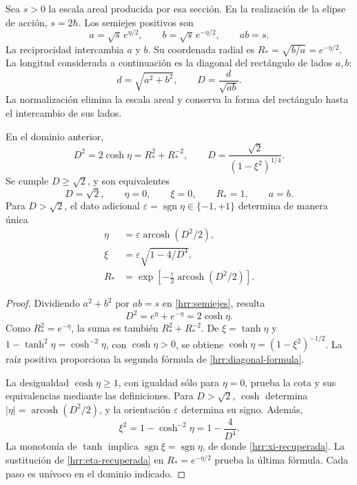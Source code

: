 Sea \(s>0\) la escala areal producida por esa sección. En la realización
de la elipse de acción, \(s=2\hbar\). Los semiejes positivos son
\begin{equation}
 a=\sqrt{s}\,e^{\eta/2},\qquad
 b=\sqrt{s}\,e^{-\eta/2},\qquad ab=s.
 \label{hrr:semiejes}
\end{equation}
La reciprocidad intercambia \(a\) y \(b\). Su coordenada radial es
\(R_*=\sqrt{b/a}=e^{-\eta/2}\). La longitud considerada a
continuación es la diagonal del rectángulo de lados \(a,b\):
\[
 d=\sqrt{a^2+b^2},\qquad D=\frac{d}{\sqrt{ab}}.
\]
La normalización elimina la escala areal y conserva la forma del
rectángulo hasta el intercambio de sus lados.

\begin{theorem}
\label{hrr:diagonal-teorema}
En el dominio anterior,
\begin{equation}
 D^2=2\cosh\eta=R_*^2+R_*^{-2},
 \qquad
 D=\frac{\sqrt2}{(1-\xi^2)^{1/4}}.
 \label{hrr:diagonal-formula}
\end{equation}
Se cumple \(D\geq\sqrt2\), y son equivalentes
\[
 D=\sqrt2,\qquad \eta=0,\qquad \xi=0,\qquad R_*=1,
 \qquad a=b.
\]
Para \(D>\sqrt2\), el dato adicional
\(\varepsilon=\operatorname{sgn}\eta\in\{-1,+1\}\) determina
de manera única
\begin{align}
 \eta&=\varepsilon\operatorname{arcosh}(D^2/2),
 \label{hrr:eta-recuperada}\\
 \xi&=\varepsilon\sqrt{1-4/D^4},
 \label{hrr:xi-recuperada}\\
 R_*&=\exp\!\left[-\frac{\varepsilon}{2}
                   \operatorname{arcosh}(D^2/2)\right].
 \label{hrr:radio-recuperado}
\end{align}
\end{theorem}
\begin{proof}
Dividiendo \(a^2+b^2\) por \(ab=s\) en
\eqref{hrr:semiejes}, resulta
\[
 D^2=e^{\eta}+e^{-\eta}=2\cosh\eta.
\]
Como \(R_*^2=e^{-\eta}\), la suma es también
\(R_*^2+R_*^{-2}\). De \(\xi=\tanh\eta\) y
\(1-\tanh^2\eta=\cosh^{-2}\eta\), con
\(\cosh\eta>0\), se obtiene
\(\cosh\eta=(1-\xi^2)^{-1/2}\). La raíz positiva proporciona
la segunda fórmula de \eqref{hrr:diagonal-formula}.

La desigualdad \(\cosh\eta\geq1\), con igualdad sólo para
\(\eta=0\), prueba la cota y sus equivalencias mediante las
definiciones. Para \(D>\sqrt2\), \(\cosh\) determina
\(|\eta|=\operatorname{arcosh}(D^2/2)\), y la orientación
\(\varepsilon\) determina su signo. Además,
\[
 \xi^2=1-\cosh^{-2}\eta=1-\frac4{D^4}.
\]
La monotonía de \(\tanh\) implica
\(\operatorname{sgn}\xi=\operatorname{sgn}\eta\), de donde
\eqref{hrr:xi-recuperada}. La sustitución de
\eqref{hrr:eta-recuperada} en \(R_*=e^{-\eta/2}\) prueba la
última fórmula. Cada paso es unívoco en el dominio indicado.
\end{proof}

